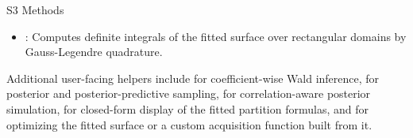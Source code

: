\begin{Section}{S3 Methods}
\begin{itemize}
\item{} : Computes definite integrals of
the fitted surface over rectangular domains by Gauss-Legendre
quadrature.

\end{itemize}


Additional user-facing helpers include  for
coefficient-wise Wald inference,  for
posterior and posterior-predictive sampling,
 for correlation-aware posterior
simulation,  for closed-form display of the fitted
partition formulas, and
 for optimizing the fitted surface or a custom
acquisition function built from it.
\end{Section}
%
